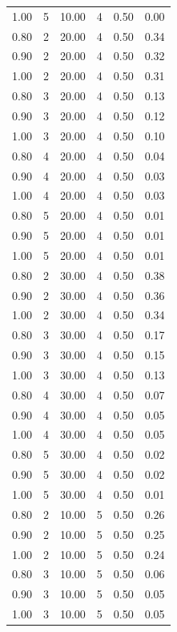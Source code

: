 \documentclass[12pt]{article}
\begin{document}
{{{{\begin{longtable}{cccccc}
  1.00 &   5 & 10.00 &   4 & 0.50 & 0.00 \\ 
  0.80 &   2 & 20.00 &   4 & 0.50 & 0.34 \\ 
  0.90 &   2 & 20.00 &   4 & 0.50 & 0.32 \\ 
  1.00 &   2 & 20.00 &   4 & 0.50 & 0.31 \\ 
  0.80 &   3 & 20.00 &   4 & 0.50 & 0.13 \\ 
  0.90 &   3 & 20.00 &   4 & 0.50 & 0.12 \\ 
  1.00 &   3 & 20.00 &   4 & 0.50 & 0.10 \\ 
  0.80 &   4 & 20.00 &   4 & 0.50 & 0.04 \\ 
  0.90 &   4 & 20.00 &   4 & 0.50 & 0.03 \\ 
  1.00 &   4 & 20.00 &   4 & 0.50 & 0.03 \\ 
  0.80 &   5 & 20.00 &   4 & 0.50 & 0.01 \\ 
  0.90 &   5 & 20.00 &   4 & 0.50 & 0.01 \\ 
  1.00 &   5 & 20.00 &   4 & 0.50 & 0.01 \\ 
  0.80 &   2 & 30.00 &   4 & 0.50 & 0.38 \\ 
  0.90 &   2 & 30.00 &   4 & 0.50 & 0.36 \\ 
  1.00 &   2 & 30.00 &   4 & 0.50 & 0.34 \\ 
  0.80 &   3 & 30.00 &   4 & 0.50 & 0.17 \\ 
  0.90 &   3 & 30.00 &   4 & 0.50 & 0.15 \\ 
  1.00 &   3 & 30.00 &   4 & 0.50 & 0.13 \\ 
  0.80 &   4 & 30.00 &   4 & 0.50 & 0.07 \\ 
  0.90 &   4 & 30.00 &   4 & 0.50 & 0.05 \\ 
  1.00 &   4 & 30.00 &   4 & 0.50 & 0.05 \\ 
  0.80 &   5 & 30.00 &   4 & 0.50 & 0.02 \\ 
  0.90 &   5 & 30.00 &   4 & 0.50 & 0.02 \\ 
  1.00 &   5 & 30.00 &   4 & 0.50 & 0.01 \\ 
  0.80 &   2 & 10.00 &   5 & 0.50 & 0.26 \\ 
  0.90 &   2 & 10.00 &   5 & 0.50 & 0.25 \\ 
  1.00 &   2 & 10.00 &   5 & 0.50 & 0.24 \\ 
  0.80 &   3 & 10.00 &   5 & 0.50 & 0.06 \\ 
  0.90 &   3 & 10.00 &   5 & 0.50 & 0.05 \\ 
  1.00 &   3 & 10.00 &   5 & 0.50 & 0.05 \\ 

\end{longtable}}}}}
\end{document}
